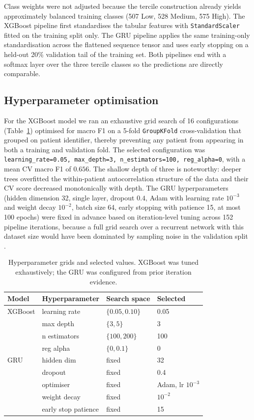 Class weights were not adjusted because the tercile construction already yields approximately balanced training classes (507 Low, 528 Medium, 575 High). The XGBoost pipeline first standardises the tabular features with \texttt{StandardScaler} fitted on the training split only. The GRU pipeline applies the same training-only standardisation across the flattened sequence tensor and uses early stopping on a held-out 20\% validation tail of the training set. Both pipelines end with a softmax layer over the three tercile classes so the predictions are directly comparable.

\subsection{Hyperparameter optimisation}\label{sec:classification-hp}

For the XGBoost model we ran an exhaustive grid search of 16 configurations (Table~\ref{tab:xgb-grid}) optimised for macro F1 on a 5-fold \texttt{GroupKFold} cross-validation that grouped on patient identifier, thereby preventing any patient from appearing in both a training and validation fold. The selected configuration was \texttt{learning\_rate=0.05, max\_depth=3, n\_estimators=100, reg\_alpha=0}, with a mean CV macro F1 of $0.656$. The shallow depth of three is noteworthy: deeper trees overfitted the within-patient autocorrelation structure of the data and their CV score decreased monotonically with depth. The GRU hyperparameters (hidden dimension 32, single layer, dropout $0.4$, Adam with learning rate $10^{-3}$ and weight decay $10^{-2}$, batch size 64, early stopping with patience 15, at most 100 epochs) were fixed in advance based on iteration-level tuning across 152 pipeline iterations, because a full grid search over a recurrent network with this dataset size would have been dominated by sampling noise in the validation split \cite{bergstra2012random}.

\begin{table}[h]
\centering
\caption{Hyperparameter grids and selected values. XGBoost was tuned exhaustively; the GRU was configured from prior iteration evidence.}
\label{tab:xgb-grid}
\small
\begin{tabular}{@{}llp{5.0cm}l@{}}
\toprule
Model & Hyperparameter & Search space & Selected \\
\midrule
XGBoost & learning rate & $\{0.05, 0.10\}$ & 0.05 \\
 & max depth & $\{3, 5\}$ & 3 \\
 & n estimators & $\{100, 200\}$ & 100 \\
 & reg alpha & $\{0, 0.1\}$ & 0 \\
\midrule
GRU & hidden dim & fixed & 32 \\
 & dropout & fixed & 0.4 \\
 & optimiser & fixed & Adam, lr $10^{-3}$ \\
 & weight decay & fixed & $10^{-2}$ \\
 & early stop patience & fixed & 15 \\
\bottomrule
\end{tabular}
\end{table}

